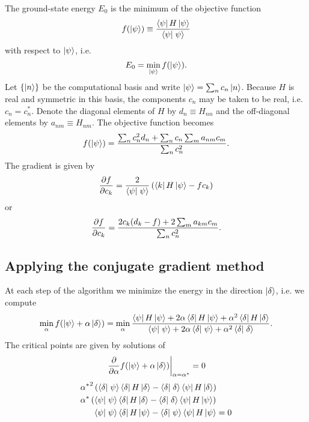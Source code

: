 The ground-state energy $E_0$ is the minimum of the objective function
\begin{equation}
  f(\ket{\psi}) 
  \equiv \frac{\matrixel{\psi}{H}{\psi}}{\braket{\psi}{\psi}}
  \label{eq:energy}
\end{equation}
with respect to $\left| \psi \right>$, i.e.
\begin{equation}
  E_0 = \min_{\left| \psi \right>} f(\left| \psi \right>).
  \label{}
\end{equation}
Let $\{\left| n \right>\}$ be the computational basis and write
$\left| \psi \right> = \sum_n c_n \left| n \right>$.
Because $H$ is real and symmetric in this basis, the components $c_n$ may be
taken to be real, i.e. $c_n=c_n^*$.
Denote the diagonal elements of $H$ by $d_n \equiv H_{n n}$ and the off-diagonal
elements by $a_{n m} \equiv H_{n m}$.
The objective function becomes
\begin{equation}
  f(\left| \psi \right>)
  = \frac{\sum_n c_n^2 d_n + \sum_n c_n \sum_m a_{n m} c_m}{\sum_n c_n^2}.
  \label{}
\end{equation}
The gradient is given by
\begin{equation}
  \pd{f}{c_k}
  = \frac{2}{\braket{\psi}{\psi}}
  \left( \matrixel{k}{H}{\psi} - f c_k \right)
  \label{eq:grad}
\end{equation}
or
\begin{equation}
  \frac{\partial f}{\partial c_k}
  = \frac{2 c_k (d_k - f) + 2 \sum_m a_{k m} c_m}{\sum_n c_n^2}.
  \label{}
\end{equation}

\subsection{Applying the conjugate gradient method}

At each step of the algorithm we minimize the energy in the direction
$\left| \delta \right>$, i.e. we compute
\begin{equation}
  \min_{\alpha} f( \ket{\psi} + \alpha \ket{\delta} )
  = \min_{\alpha}
  \frac{
      \matrixel{\psi}{H}{\psi}
      + 2 \alpha \matrixel{\delta}{H}{\psi}
      + \alpha^2 \matrixel{\delta}{H}{\delta}
    }
    {
      \braket{\psi}{\psi}
      + 2 \alpha \braket{\delta}{\psi}
      + \alpha^2 \braket{\delta}{\delta}
    }.
  \label{}
\end{equation}
The critical points are given by solutions of
\begin{equation}
  \left. \frac{\partial }{\partial \alpha} f(\left| \psi \right> + \alpha \left| \delta \right>) \right|_{\alpha=\alpha^*} = 0
  \label{}
\end{equation}
\begin{align}
  &{\alpha^*}^2 \left( \braket{\delta}{\psi} \matrixel{\delta}{H}{\delta}
    - \braket{\delta}{\delta} \matrixel{\psi}{H}{\delta} \right) \\
  &\alpha^* \left( \braket{\psi}{\psi} \matrixel{\delta}{H}{\delta}
    - \braket{\delta}{\delta} \matrixel{\psi}{H}{\psi} \right) \\
  &\phantom{\alpha^*(} \braket{\psi}{\psi} \matrixel{\delta}{H}{\psi}
    - \braket{\delta}{\psi} \matrixel{\psi}{H}{\psi} = 0
  \label{}
\end{align}

